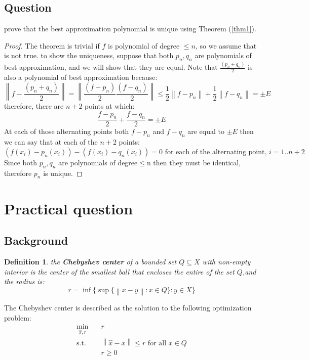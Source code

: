 \documentclass[]{article}
\newtheorem{definition}{Definition}[]
\newcommand{\norm}[1]{\left\lVert#1\right\rVert}
\newcommand{\Q}[0]{\textit{Q}}
\begin{document}
\subsection{Question}
prove that the best approximation polynomial is unique using Theorem (\ref{thm1}). 
\begin{proof}
	The theorem is trivial if $f$ is polynomial of degree $\leq n$, so we assume that is not true. to show the uniqueness, suppose that both $p_n, q_n$ are polynomials of best approximation, and we will show that they are equal.
	Note that $\frac{(p_n + q_n)}{2}$ is also a polynomial of best approximation because:
	\begin{equation*}
		 \norm{f-\frac{(p_n + q_n)}{2}} = \norm{\frac{(f - p_n)}{2} \frac{(f - q_n)}{2}} \leq \frac{1}{2}\norm{f-p_n} + 
		 \frac{1}{2}\norm{f-q_n} = \pm E
	\end{equation*}
	therefore, there are $n+2$ points at which:
	\begin{equation*}
		\frac{f-p_n}{2}+\frac{f-q_n}{2}=\pm E
	\end{equation*}
	At each of those alternating points both $f-p_n$ and $f-q_n$ are equal to $\pm E$ then we can say that at each of the $n+2$ points:
	\begin{equation*}
		(f(x_i) - p_n(x_i)) - (f(x_i)-q_n(x_i)) = 0 \text{ for each of the alternating point, }i=1..n+2
	\end{equation*}
	Since both $p_n,q_n$ are polynomials of degree$\leq$n then they must be identical, therefore $p_n$ is unique.
\end{proof}

\section{Practical question}
\subsection{Background}
\begin{definition}
	the \textbf{Chebyshev center}\cite{convexOptimization} of a bounded set $\textit{Q}\subseteq X$ with non-empty interior is the center of the smallest ball that encloses the entire of the set $\Q$,and the radius is:
	\begin{equation*}
		r=\inf\{\sup\{\norm{x-y}:x\in\Q\}:y\in X\}
	\end{equation*}
\end{definition}
The Chebyshev center is described as the solution to the following optimization problem:
\begin{equation}
	\begin{aligned}
		\min_{\hat{x},r} \quad &r \\
		\text{s.t.}\quad &\norm{\hat{x} - x} \leq r \text{ for all }x\in\Q \\
		\quad & r\geq 0
	\end{aligned}
\end{equation}


\printbibliography[
heading=bibintoc,
title={References}
]
\end{document}
